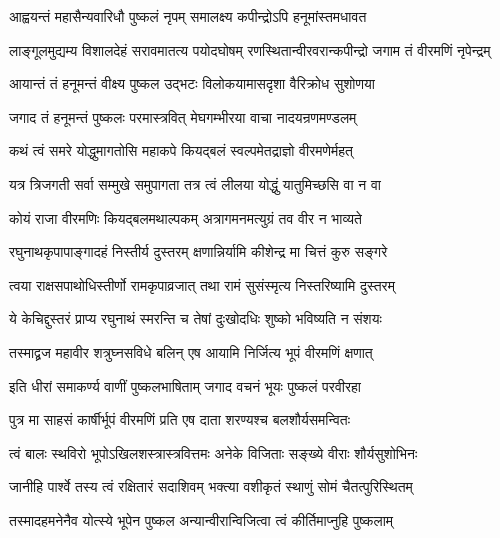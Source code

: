 \resetShloka


\twolineshloka
{आह्वयन्तं महासैन्यवारिधौ पुष्कलं नृपम्}
{समालक्ष्य कपीन्द्रोऽपि हनूमांस्तमधावत}%

\fourlineindentedshloka
{लाङ्गूलमुद्यम्य विशालदेहं}
{सरावमातत्य पयोदघोषम्}
{रणस्थितान्वीरवरान्कपीन्द्रो}
{जगाम तं वीरमणिं नृपेन्द्रम्}%

\twolineshloka
{आयान्तं तं हनूमन्तं वीक्ष्य पुष्कल उद्भटः}
{विलोकयामासदृशा वैरिक्रोध सुशोणया}%

\twolineshloka
{जगाद तं हनूमन्तं पुष्कलः परमास्त्रवित्}
{मेघगम्भीरया वाचा नादयन्रणमण्डलम्}%


\twolineshloka
{कथं त्वं समरे योद्धुमागतोसि महाकपे}
{कियद्बलं स्वल्पमेतद्राज्ञो वीरमणेर्महत्}%

\twolineshloka
{यत्र त्रिजगती सर्वा सम्मुखे समुपागता}
{तत्र त्वं लीलया योद्धुं यातुमिच्छसि वा न वा}%

\twolineshloka
{कोयं राजा वीरमणिः कियद्बलमथाल्पकम्}
{अत्रागमनमत्युग्रं तव वीर न भाव्यते}%

\twolineshloka
{रघुनाथकृपापाङ्गादहं निस्तीर्य दुस्तरम्}
{क्षणान्निर्यामि कीशेन्द्र मा चित्तं कुरु सङ्गरे}%

\twolineshloka
{त्वया राक्षसपाथोधिस्तीर्णो रामकृपाव्रजात्}
{तथा रामं सुसंस्मृत्य निस्तरिष्यामि दुस्तरम्}%

\twolineshloka
{ये केचिद्दुस्तरं प्राप्य रघुनाथं स्मरन्ति च}
{तेषां दुःखोदधिः शुष्को भविष्यति न संशयः}%

\twolineshloka
{तस्माद्व्रज महावीर शत्रुघ्नसविधे बलिन्}
{एष आयामि निर्जित्य भूपं वीरमणिं क्षणात्}%


\twolineshloka
{इति धीरां समाकर्ण्य वाणीं पुष्कलभाषिताम्}
{जगाद वचनं भूयः पुष्कलं परवीरहा}%


\twolineshloka
{पुत्र मा साहसं कार्षीर्भूपं वीरमणिं प्रति}
{एष दाता शरण्यश्च बलशौर्यसमन्वितः}%

\twolineshloka
{त्वं बालः स्थविरो भूपोऽखिलशस्त्रास्त्रवित्तमः}
{अनेके विजिताः सङ्ख्ये वीराः शौर्यसुशोभिनः}%

\twolineshloka
{जानीहि पार्श्वे तस्य त्वं रक्षितारं सदाशिवम्}
{भक्त्या वशीकृतं स्थाणुं सोमं चैतत्पुरिस्थितम्}%

\twolineshloka
{तस्मादहमनेनैव योत्स्ये भूपेन पुष्कल}
{अन्यान्वीरान्विजित्वा त्वं कीर्तिमाप्नुहि पुष्कलाम्}%

